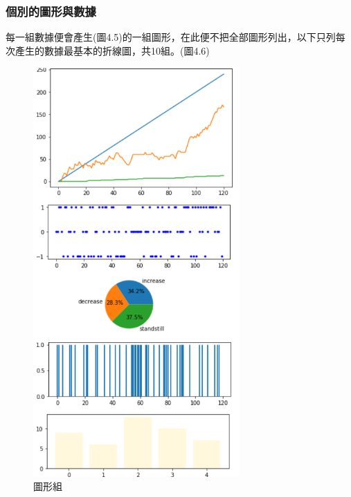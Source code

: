 \subsubsection{個別的圖形與數據}
每一組數據便會產生(圖4.5)的一組圖形，在此便不把全部圖形列出，以下只列每次產生的數據最基本的折線圖，共10組。(圖4.6)
	\begin{figure}[H] 
	\centering 
	\includegraphics[width=0.7\textwidth]{4_5.png} 
	\caption{圖形組} 
	\label{Fig.4.5} 
	\end{figure}
